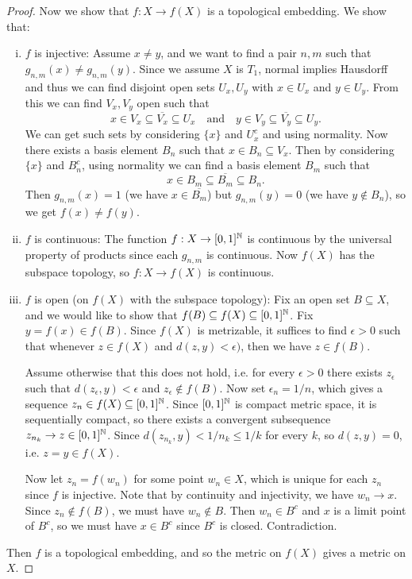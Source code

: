 \begin{proof}
  Now we show that $f : X \to f(X)$ is a
  topological embedding. We show that:
  \begin{enumerate}[(i)]
    \item $f$ is injective: Assume
      $x \ne y$, and we want to find a pair $n, m$
      such that $g_{n, m}(x) \ne g_{n, m}(y)$.
      Since we assume $X$ is $T_1$, normal implies
      Hausdorff and thus
      we can find disjoint open sets $U_x, U_y$
      with $x \in U_x$ and $y \in U_y$. From this
      we can find $V_x, V_y$ open such that
      \[
        x \in V_x \subseteq \overline{V_x} \subseteq U_x
        \quad \text{and} \quad
        y \in V_y \subseteq \overline{V_y} \subseteq U_y.
      \]
      We can get such sets by considering
      $\{x\}$ and $U_x^c$ and using normality. Now
      there exists a basis element $B_n$ such that
      $x \in B_n \subseteq V_x$. Then by considering
      $\{x\}$ and $B_n^c$,  using normality we can
      find a basis element $B_m$ such that
      \[
        x \in B_m \subseteq \overline{B_m} \subseteq B_n.
      \]
      Then $g_{n, m}(x) = 1$ (we have
      $x \in \overline{B_m}$) but $g_{n, m}(y) = 0$
      (we have $y \notin B_n$),
      so we get $f(x) \ne f(y)$.
    \item $f$ is continuous: The function
      $f : X \to [0, 1]^{\mathbb{N}}$ is continuous by the
      universal property of products since
      each $g_{n, m}$ is continuous. Now
      $f(X)$ has the subspace topology, so $f : X \to f(X)$
      is continuous.
    \item $f$ is open (on $f(X)$ with the subspace topology): Fix an open set $B \subseteq X$,
      and we would like to show that
      $f(B) \subseteq f(X) \subseteq [0, 1]^{\mathbb{N}}$.
      Fix $y = f(x) \in f(B)$.
      Since $f(X)$ is metrizable, it suffices
      to find $\epsilon > 0$ such that whenever
      $z \in f(X)$ and $d(z, y) < \epsilon)$, then
      we have $z \in f(B)$.

      Assume otherwise that this
      does not hold, i.e. for every $\epsilon > 0$
      there exists $z_\epsilon$ such that
      $d(z_\epsilon, y) < \epsilon$ and $z_\epsilon \notin f(B)$.
      Now set $\epsilon_n = 1 / n$, which gives a
      sequence $z_n \in f(X) \subseteq [0, 1]^{\mathbb{N}}$.
      Since $[0, 1]^{\mathbb{N}}$ is compact metric space,
      it is sequentially compact, so there exists a
      convergent subsequence $z_{n_k} \to z \in [0, 1]^{\mathbb{N}}$.
      Since $d(z_{n_k}, y) < 1 / n_k \le 1 / k$ for
      every $k$, so $d(z, y) = 0$, i.e. $z = y \in f(X)$.

      Now let $z_n = f(w_n)$ for some point
      $w_n \in X$, which is unique for each $z_n$
      since $f$ is injective. Note that by
      continuity and injectivity, we have
      $w_n \to x$. Since
      $z_n \notin f(B)$, we must have $w_n \notin B$.
      Then $w_n \in B^c$ and $x$ is a limit point
      of $B^c$, so we must have $x \in B^c$ since
      $B^c$ is closed. Contradiction.
  \end{enumerate}
  Then $f$ is a topological embedding, and so the
  metric on $f(X)$ gives a metric on $X$.
\end{proof}

